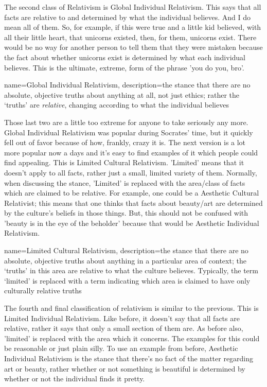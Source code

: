 The second class of Relativism is \gls{Global Individual Relativism}. This says that all facts are relative to and determined by what the individual believes. And I do mean all of them. So, for example, if this were true and a little kid believed, with all their little heart, that unicorns existed, then, for them, unicorns exist. There would be no way for another person to tell them that they were mistaken because the fact about whether unicorns exist is determined by what each individual believes. This is the ultimate, extreme, form of the phrase 'you do you, bro'.

{
  name=Global Individual Relativism,
  description={the stance that there are no absolute, objective truths about anything at all, not just ethics; rather the `truths' are \emph{relative}, changing according to what the individual believes}
}


Those last two are a little too extreme for anyone to take seriously any more. Global Individual Relativism was popular during Socrates' time, but it quickly fell out of favor because of how, frankly, crazy it is. The next version is a lot more popular now a days and it's easy to find examples of it which people could find appealing. This is \gls{Limited Cultural Relativism}. 'Limited' means that it doesn't apply to all facts, rather just a small, limited variety of them. Normally, when discussing the stance, 'Limited' is replaced with the area/class of facts which are claimed to be relative. For example, one could be a Aesthetic Cultural Relativist; this means that one thinks that facts about beauty/art are determined by the culture's beliefs in those things. But, this should not be confused with 'beauty is in the eye of the beholder' because that would be Aesthetic Individual Relativism. 

{
  name=Limited Cultural Relativism,
  description={the stance that there are no absolute, objective truths about anything in a particular area of context; the `truths' in this area are relative to what the culture believes. Typically, the term `limited' is replaced with a term indicating which area is claimed to have only culturally relative truths}
}


The fourth and final classification of relativism is similar to the previous. This is Limited Individual Relativism. Like before, it doesn't say that all facts are relative, rather it says that only a small section of them are. As before also, 'limited' is replaced with the area which it concerns. The examples for this could be reasonable or just plain silly.  To use an example from before, Aesthetic Individual Relativism is the stance that there's no fact of the matter regarding art or beauty, rather whether or not something is beautiful is determined by whether or not the individual finds it pretty.

